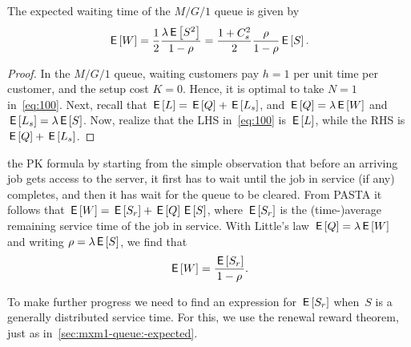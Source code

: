 \documentclass[stochastic-or.tex]{subfiles}
\begin{document}
\begin{theorem}
The expected waiting time of the $M/G/1$ queue is given by
\begin{equation}\label{eq:4}
 \,\mathsf{E}\left[W\right] = \frac 1 2 \frac{\lambda \,\mathsf{E}\left[S^2\right]}{1-\rho} =\frac{1 + C_s^2}2 \frac{\rho}{1-\rho} \,\mathsf{E}\left[S\right].
\end{equation}
\end{theorem}
\begin{proof}
In the $M/G/1$ queue, waiting customers pay $h=1$ per unit time per customer, and the setup cost $K=0$. Hence, it is optimal to take $N=1$ in~\cref{eq:100}.
Next, recall that $\,\mathsf{E}\left[L\right] = \,\mathsf{E}\left[Q\right] + \,\mathsf{E}\left[L_s\right]$, and $\,\mathsf{E}\left[Q\right] = \lambda \,\mathsf{E}\left[W\right]$ and $\,\mathsf{E}\left[L_s\right] = \lambda \,\mathsf{E}\left[S\right]$. Now,  realize that the LHS in~\cref{eq:100} is $\,\mathsf{E}\left[L\right]$, while the RHS is $\,\mathsf{E}\left[Q\right] + \,\mathsf{E}\left[L_s\right]$.
\end{proof}


 the PK formula by starting from the simple observation that before an arriving job gets access to the server, it first has to wait until the job in service (if any) completes, and then it has wait for the queue to be cleared.
From PASTA it follows that $\,\mathsf{E}\left[W\right] = \,\mathsf{E}\left[S_r\right] + \,\mathsf{E}\left[Q\right] \,\mathsf{E}\left[S\right]$, where $\,\mathsf{E}\left[S_r\right]$ is the (time-)average remaining service time of the job in service.
With Little's law $\,\mathsf{E}\left[Q\right] = \lambda \,\mathsf{E}\left[W\right]$ and writing $\rho = \lambda \,\mathsf{E}\left[S\right]$, we find that
\begin{equation*}
 \,\mathsf{E}\left[W\right] = \frac{\,\mathsf{E}\left[S_r\right]}{1-\rho}.
\end{equation*}

To make further progress we need to find an expression for $\,\mathsf{E}\left[S_r\right]$ when~$S$ is a generally distributed service time.
For this, we use the renewal reward theorem, just as in~\cref{sec:mxm1-queue:-expected}.
\end{document}
